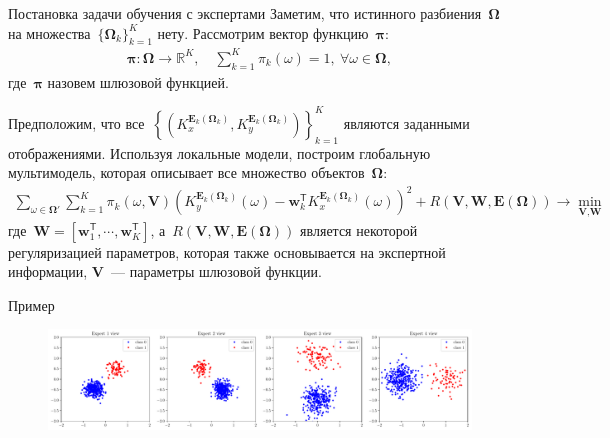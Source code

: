 \documentclass[9pt,pdf,hyperref={unicode}]{beamer}
\begin{document}
\begin{frame}{Постановка задачи обучения с экспертами}
\justifying
Заметим, что истинного разбиения~$\bm{\Omega}$ на множества~$\{\bm{\Omega}_k\}_{k=1}^{K}$ нету. Рассмотрим вектор функцию~$\bm{\pi}$:
\begin{equation*}
\label{eq:st:8}
\begin{aligned}
\bm{\pi}:\bm{\Omega}\to \mathbb{R}^{K}, \quad \sum_{k=1}^{K}\pi_{k}\left(\omega\right)=1,~\forall\omega\in\bm{\Omega},
\end{aligned}
\end{equation*}
где~$\bm{\pi}$ назовем шлюзовой функцией.

Предположим, что все~$\left\{\left(K_x^{\bm{E}_k\left(\bm{\Omega}_k\right)}, K_y^{\bm{E}_k\left(\bm{\Omega}_k\right)}\right)\right\}_{k=1}^{K}$ являются заданными отображениями. Используя локальные модели, построим глобальную мультимодель, которая описывает все множество объектов~$\bm{\Omega}$:
\begin{equation*}
\label{eq:st:9}
\begin{aligned}
\sum_{\omega \in \bm{\Omega}'}\sum_{k=1}^{K}\pi_{k}\left(\omega, \textbf{V}\right)\left(K_y^{\bm{E}_k\left(\bm{\Omega}_k\right)}\left(\omega\right) - \textbf{w}_{k}^{\mathsf{T}}K_x^{\bm{E}_k\left(\bm{\Omega}_k\right)}\left(\omega\right) \right)^2 + R\left(\textbf{V}, \textbf{W}, \bm{E}\left(\bm{\Omega}\right)\right) \to \min_{\textbf{V}, \textbf{W}}
\end{aligned}
\end{equation*}
где~$\textbf{W}=[\textbf{w}_1^\mathsf{T}, \cdots, \textbf{w}_K^{\mathsf{T}}]$, а~$R\left(\textbf{V}, \textbf{W}, \bm{E}\left(\bm{\Omega}\right)\right)$ является некоторой регуляризацией параметров, которая также основывается на экспертной информации, $\textbf{V}$~--- параметры шлюзовой функции.
\end{frame}

\begin{frame}{Пример}
\justifying

\begin{figure}[h!t]\center
\includegraphics[width=1.0\textwidth]{figures/expert_example}
\label{intro:fig1}
\end{figure}

\end{frame}
\end{document}
